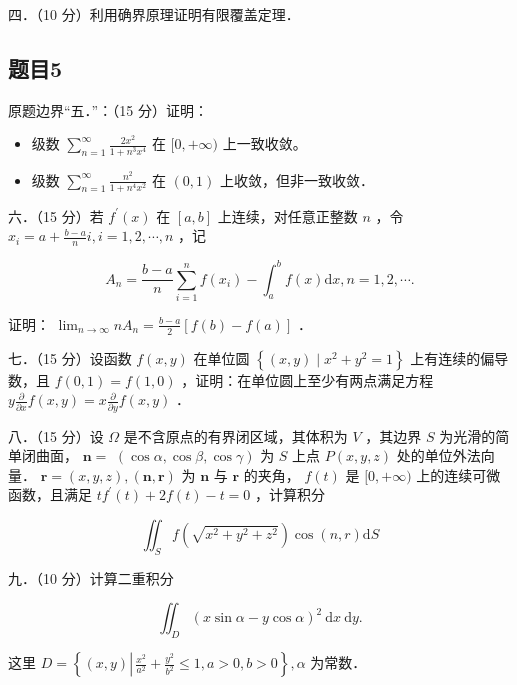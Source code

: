 \documentclass{article}
\begin{document}
四．（10 分）利用确界原理证明有限覆盖定理．

\begin{itemize}
\end{itemize}

\subsection{题目5}
原题边界“五．”：（15 分）证明：

\begin{itemize}
\item[（1）] 级数 \(\sum_{n=1}^{\infty} \frac{2 x^{2}}{1+n^{3} x^{4}}\) 在 \([0,+\infty)\) 上一致收敛。
  \item[（2）] 级数 \(\sum_{n=1}^{\infty} \frac{n^{2}}{1+n^{4} x^{2}}\) 在 \((0,1)\) 上收敛，但非一致收敛．
\end{itemize}

六．（15 分）若 \(f^{\prime}(x)\) 在 \([a, b]\) 上连续，对任意正整数 \(n\) ，令 \(x_{i}=a+\frac{b-a}{n} i, i=1,2, \cdots, n\) ，记

\[
A_{n}=\frac{b-a}{n} \sum_{i=1}^{n} f\left(x_{i}\right)-\int_{a}^{b} f(x) \mathrm{d} x, n=1,2, \cdots .
\]

证明： \(\lim _{n \rightarrow \infty} n A_{n}=\frac{b-a}{2}[f(b)-f(a)]\) ．

七．（15 分）设函数 \(f(x, y)\) 在单位圆 \(\left\{(x, y) \mid x^{2}+y^{2}=1\right\}\) 上有连续的偏导数，且 \(f(0,1)=f(1,0)\) ，证明：在单位圆上至少有两点满足方程 \(y \frac{\partial}{\partial x} f(x, y)=x \frac{\partial}{\partial y} f(x, y)\) ．

八．（15 分）设 \(\Omega\) 是不含原点的有界闭区域，其体积为 \(V\) ，其边界 \(S\) 为光滑的简单闭曲面， \(\mathbf{n}=\) \((\cos \alpha, \cos \beta, \cos \gamma)\) 为 \(S\) 上点 \(P(x, y, z)\) 处的单位外法向量． \(\mathbf{r}=(x, y, z),(\mathbf{n}, \mathbf{r})\) 为 \(\mathbf{n}\) 与 \(\mathbf{r}\) 的夹角， \(f(t)\) 是 \([0,+\infty)\) 上的连续可微函数，且满足 \(t f^{\prime}(t)+2 f(t)-t=0\) ，计算积分

\[
\iint_{S} f\left(\sqrt{x^{2}+y^{2}+z^{2}}\right) \cos (n, r) \mathrm{d} S
\]

九．（10 分）计算二重积分

\[
\iint_{D}(x \sin \alpha-y \cos \alpha)^{2} \mathrm{~d} x \mathrm{~d} y .
\]

这里 \(D=\left\{(x, y) \left\lvert\, \frac{x^{2}}{a^{2}}+\frac{y^{2}}{b^{2}} \leq 1\right., a>0, b>0\right\}, \alpha\) 为常数．
\end{document}
